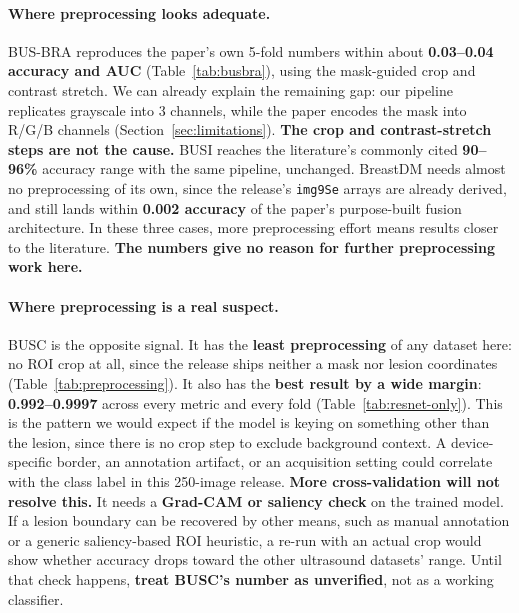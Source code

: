 \documentclass[11pt]{article}
\begin{document}
\paragraph{Where preprocessing looks adequate.} BUS-BRA reproduces the
paper's own 5-fold numbers within about \textbf{0.03--0.04 accuracy and
AUC} (Table~\ref{tab:busbra}), using the mask-guided crop and contrast
stretch. We can already explain the remaining gap: our pipeline replicates
grayscale into 3 channels, while the paper encodes the mask into R/G/B
channels (Section~\ref{sec:limitations}). \textbf{The crop and
contrast-stretch steps are not the cause.} BUSI reaches the literature's
commonly cited \textbf{90--96\%} accuracy range with the same pipeline,
unchanged. BreastDM needs almost no preprocessing of its own, since the
release's \texttt{img9Se} arrays are already derived, and still lands
within \textbf{0.002 accuracy} of the paper's purpose-built fusion
architecture. In these three cases, more preprocessing effort means results
closer to the literature. \textbf{The numbers give no reason for further
preprocessing work here.}

\paragraph{Where preprocessing is a real suspect.} BUSC is the opposite
signal. It has the \textbf{least preprocessing} of any dataset here: no ROI
crop at all, since the release ships neither a mask nor lesion coordinates
(Table~\ref{tab:preprocessing}). It also has the \textbf{best result by a
wide margin}: \textbf{0.992--0.9997} across every metric and every fold
(Table~\ref{tab:resnet-only}). This is the pattern we would expect if the
model is keying on something other than the lesion, since there is no crop
step to exclude background context. A device-specific border, an
annotation artifact, or an acquisition setting could correlate with the
class label in this 250-image release. \textbf{More cross-validation will
not resolve this.} It needs a \textbf{Grad-CAM or saliency check} on the
trained model. If a lesion boundary can be recovered by other means, such
as manual annotation or a generic saliency-based ROI heuristic, a re-run
with an actual crop would show whether accuracy drops toward the other
ultrasound datasets' range. Until that check happens, \textbf{treat BUSC's
number as unverified}, not as a working classifier.
\end{document}
